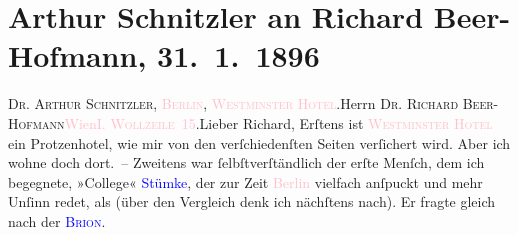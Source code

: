 

               \section[Arthur Schnitzler an Richard Beer-Hofmann, 31. 1. 1896]{ Arthur Schnitzler an Richard Beer-Hofmann,
               31. 1. 1896}\nopagebreak{}\rehead{ }\normalsize\beginnumbering{} \toendnotes[C]{\smallbreak\pagebreak[2]} 
\toendnotes[C]{\smallbreak}\pstart{}{\pb}\textsc{Dr. Arthur Schnitzler, \textcolor{pink}{Berlin}{}\ledrightnote{\textcolor{pink}{Berlin}}, \textcolor{pink}{Westminster Hotel}{}\ledrightnote{\textcolor{pink}{Hotel Westminster}}}.\pend{}{\bigskip}\pstart{}{\pb}Herrn \textsc{Dr. Richard
                     Beer-Hofmann}\pend{}\pstart{}\textcolor{pink}{Wien}{}\ledrightnote{\textcolor{pink}{Wien}}\pend{}\pstart{}\textsc{\textcolor{pink}{I. Wollzeile 15}{}\ledrightnote{\textcolor{pink}{Wollzeile}}}.\pend{}{\bigskip}\pstart{}{\pb}Lieber Richard,\pend\pstart
           Erſtens ist \textcolor{pink}{\textsc{Westminster Hotel}}{}\ledrightnote{\textcolor{pink}{Hotel Westminster}} ein Protzenhotel, wie mir von den verſchiedenſten Seiten verſichert wird. Aber
               ich wohne doch dort. –\pend
           \pstart
           Zweitens war ſelbſtverſtändlich der erſte Menſch, dem ich begegnete, »College« \textcolor{blue}{Stümke}{}\ledrightnote{\textcolor{blue}{Heinrich Stümcke}}, der zur Zeit \textcolor{pink}{Berlin}{}\ledrightnote{\textcolor{pink}{Berlin}} vielfach anſpuckt und mehr Unſinn redet, als (über den {\pb}Vergleich denk ich nächſtens nach). Er fragte
               gleich nach der \textsc{\textcolor{blue}{Brion}{}\ledrightnote{\textcolor{blue}{Lou Brion}}}.
